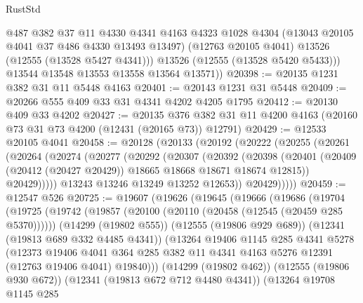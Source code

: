 \begin{lexlean}{RustStd}
\begin{coremodule}
            @487
            @382
            @37
            @11
            @4330
            @4341
            @4163
            @4323
            @1028
            @4304
            (@13043 @20105 @4041 @37 @486 @4330 @13493 @13497)
            (@12763 @20105 @4041)
            @13526
            (@12555 (@13528 @5427 @4341)))
          @13526
          (@12555 (@13528 @5420 @5433)))
        @13544
        @13548
        @13553
        @13558
        @13564
        @13571))
@20398 := @20135 @1231 @382 @31 @11 @5448 @4163
@20401 := @20143 @1231 @31 @5448
@20409 := @20266 @555 @409 @33 @31 @4341 @4202 @4205 @1795
@20412 := @20130 @409 @33 @4202
@20427 := @20135
    @376
    @382
    @31
    @11
    @4200
    @4163
    (@20160 @73 @31 @73 @4200 (@12431 (@20165 @73)) @12791)
@20429 := @12533 @20105 @4041
@20458 := @20128
    (@20133
      (@20192
        (@20222
          (@20255
            (@20261
              (@20264
                (@20274
                  (@20277
                    (@20292
                      (@20307
                        (@20392
                          (@20398
                            (@20401
                              (@20409 (@20412 (@20427 @20429)) @18665 @18668 @18671 @18674 @12815))
                            @20429)))))
                  @13243
                  @13246
                  @13249
                  @13252
                  @12653))
              @20429)))))
@20459 := @12547 @526
@20725 := @19607
    (@19626
      (@19645
        (@19666
          (@19686
            (@19704
              (@19725
                (@19742
                  (@19857 (@20100 (@20110 (@20458 (@12545 (@20459 @285 @5370))))))
                  (@14299 (@19802 @555))
                  (@12555 (@19806 @929 @689))
                  (@12341 (@19813 @689 @332 @4485 @4341))
                  (@13264
                    @19406
                    @1145
                    @285
                    @4341
                    @5278
                    (@12373
                      @19406
                      @4041
                      @364
                      @285
                      @382
                      @11
                      @4341
                      @4163
                      @5276
                      @12391
                      (@12763 @19406 @4041)
                      @19840)))
                (@14299 (@19802 @462))
                (@12555 (@19806 @930 @672))
                (@12341 (@19813 @672 @712 @4480 @4341))
                (@13264
                  @19708
                  @1145
                  @285

\end{coremodule}
\end{lexlean}
